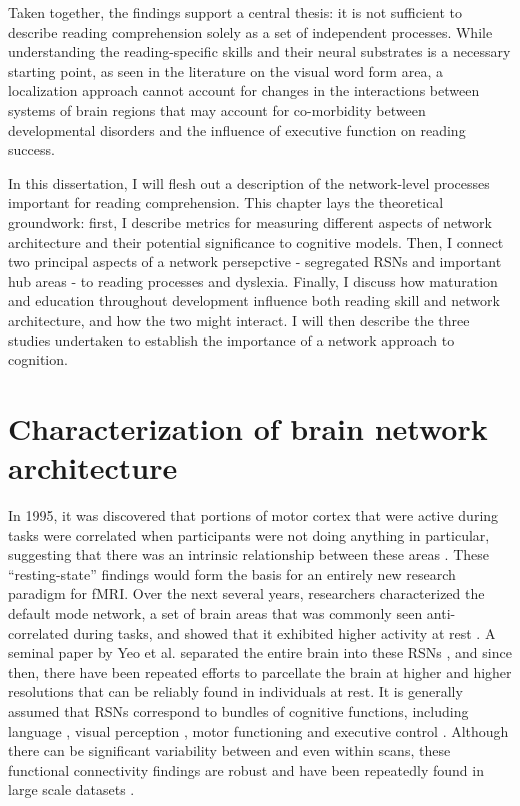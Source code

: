 Taken together, the findings support a central thesis: it is not sufficient to describe reading comprehension solely as a set of independent processes. While understanding the reading-specific skills and their neural substrates is a necessary starting point, as seen in the literature on the visual word form area, a localization approach cannot account for changes in the interactions between systems of brain regions that may account for co-morbidity between developmental disorders and the influence of executive function on reading success. 

In this dissertation, I will flesh out a description of the network-level processes important for reading comprehension. This chapter lays the theoretical groundwork: first, I describe metrics for measuring different aspects of network architecture and their potential significance to cognitive models. Then, I connect two principal aspects of a network persepctive - segregated RSNs and important hub areas - to reading processes and dyslexia. Finally, I discuss how maturation and education throughout development influence both reading skill and network architecture, and how the two might interact. I will then describe the three studies undertaken to establish the importance of a network approach to cognition.


\section{Characterization of brain network architecture}

In 1995, it was discovered that portions of motor cortex that were active during tasks were correlated when participants were not doing anything in particular, suggesting that there was an intrinsic relationship between these areas \citep{Biswal1995}. These ``resting-state'' findings would form the basis for an entirely new research paradigm for fMRI. Over the next several years, researchers characterized the default mode network, a set of brain areas that was commonly seen anti-correlated during tasks, and showed that it exhibited higher activity at rest \citep{Greicius2003}. A seminal paper by Yeo et al. separated the entire brain into these RSNs \citep{Yeo2011}, and since then, there have been repeated efforts to parcellate the brain at higher and higher resolutions that can be reliably found in individuals at rest. It is generally assumed that RSNs correspond to bundles of cognitive functions, including language \citep{Cordes2000, Hampson2002}, visual perception \citep{Simmons2012}, motor functioning \citep{Biswal1995} and executive control \citep{Seeley2007}. Although there can be significant variability between and even within scans, these functional connectivity findings are robust and have been repeatedly found in large scale datasets \citep{Honey2009}.

